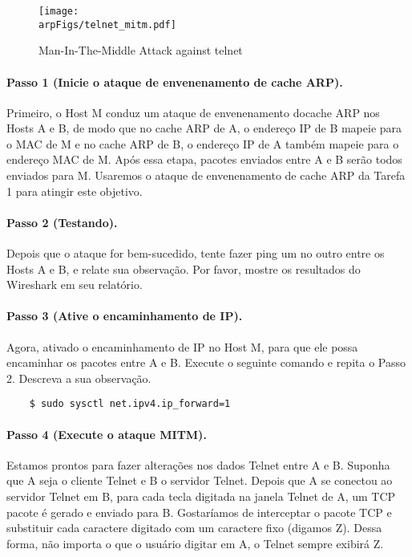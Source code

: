 	\begin{figure}
		\centering
		\texttt{[image: \\arpFigs/telnet\_mitm.pdf]}
		\caption{Man-In-The-Middle Attack against telnet}
		\label{arp:fig:telnet_mitm}
	\end{figure}
	
	
	\paragraph{Passo 1 (Inicie o ataque de envenenamento de cache ARP).} Primeiro, o Host M conduz um 
	ataque de envenenamento docache ARP nos Hosts A e B, de modo que no cache ARP de A, o endereço IP de B mapeie para o MAC de M
	e no cache ARP de B, o endereço IP de A também mapeie para o endereço MAC de M. Após essa etapa,
	pacotes enviados entre A e B serão todos enviados para M. Usaremos o ataque de envenenamento de cache ARP
	da Tarefa 1 para atingir este objetivo. 
	
	
	\paragraph{Passo 2 (Testando).} Depois que o ataque for bem-sucedido, tente fazer ping um no outro
	entre os Hosts A e B, e relate sua observação. Por favor, mostre os resultados do Wireshark em seu
	relatório.
	
	\paragraph{Passo 3 (Ative o encaminhamento de IP).} Agora, ativado o encaminhamento de IP no Host M, para que ele possa
	encaminhar os pacotes entre A e B. Execute o seguinte comando e repita o Passo 2.
	Descreva a sua observação.
	
	\begin{lstlisting}
	$ sudo sysctl net.ipv4.ip_forward=1
	\end{lstlisting}
	
	\paragraph{Passo 4 (Execute o ataque MITM).} Estamos prontos para fazer alterações nos dados Telnet
	entre A e B. Suponha que A seja o cliente Telnet e B o servidor Telnet. Depois que A se conectou 
	ao servidor Telnet em B, para cada tecla digitada na janela Telnet de A, um TCP
	pacote é gerado e enviado para B. Gostaríamos de interceptar o pacote TCP e substituir cada 
	caractere digitado com um caractere fixo (digamos Z). Dessa forma, não importa o que o usuário
	digitar em A, o Telnet sempre exibirá Z.
	
